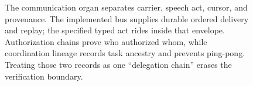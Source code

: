 \begin{figure}[H]
{%
}
\caption{The communication organ separates carrier, speech act, cursor, and provenance.
The implemented bus supplies durable ordered delivery and replay; the specified typed
act rides inside that envelope. Authorization chains prove who authorized whom, while
coordination lineage records task ancestry and prevents ping-pong. Treating those
two records as one ``delegation chain'' erases the verification boundary.}
\label{fig:swk-comm-organ}
\end{figure}
